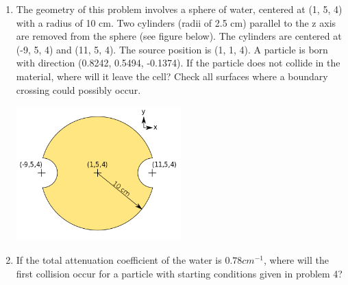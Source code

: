 \documentclass{article}
\begin{document}
\begin{enumerate}
  \newpage

\item The geometry of this problem involves a sphere of water, centered at (1, 5, 4) with a radius of 10 cm.
Two cylinders (radii of 2.5 cm) parallel to the z axis are removed from the sphere (see figure below).
The cylinders are centered at (-9, 5, 4) and (11, 5, 4). The source position is (1, 1, 4). A particle is
born with direction (0.8242, 0.5494, -0.1374). If the particle does not collide in the material, where will
it leave the cell? Check all surfaces where a boundary crossing could possibly occur.


\begin{center}
  \includegraphics[width=2.5in]{exam1-analytic-geom.png}
\end{center}


\item If the total attenuation coefficient of the water is $0.78 cm^{-1}$,
  where will the first collision occur for a particle with starting conditions
  given in problem 4?

\end{enumerate}
\end{document}
